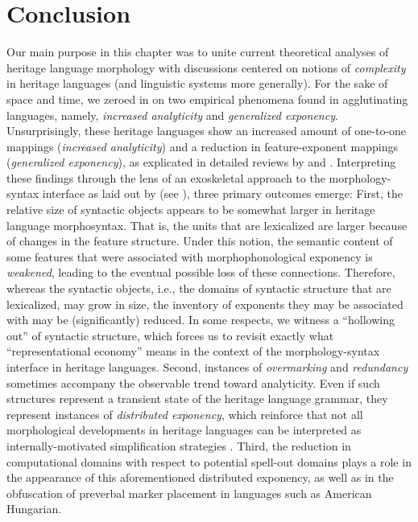 \documentclass[output=paper,colorlinks,citecolor=brown,footheight=42pt]{langscibook}
\begin{document}
\section{Conclusion} \label{outro}\largerpage[2]
Our main purpose in this chapter was to unite current theoretical analyses of heritage language morphology with discussions centered on notions of \textit{complexity} in heritage languages (and linguistic systems more generally). For the sake of space and time, we zeroed in on two empirical phenomena found in agglutinating languages, namely, \textit{increased analyticity} and \textit{generalized exponency}. Unsurprisingly, these heritage languages show an increased amount of one-to-one mappings (\textit{increased analyticity}) and a reduction in feature-exponent mappings (\textit{generalized exponency}), as explicated in detailed reviews by \citet[Ch.5]{polinsky2018heritage} and \citet{putnametal2021}. Interpreting these findings through the lens of an exoskeletal approach to the morphology-syntax interface as laid out by \citet{lohnput21} (see ), three primary outcomes emerge: First, the relative size of syntactic objects appears to be somewhat larger in heritage language morphosyntax. That is, the units that are lexicalized are larger because of changes in the feature structure. Under this notion, the semantic content of some features that were associated with morphophonological exponency is \textit{weakened}, leading to the eventual possible loss of these connections. Therefore, whereas the syntactic objects, i.e., the domains of syntactic structure that are lexicalized, may grow in size, the inventory of exponents they may be associated with may be (significantly) reduced. In some respects, we witness a “hollowing out” of syntactic structure, which forces us to revisit exactly what “representational economy” \citep{scontras2015,ScontrasEtAl2018,PolinskyScontras2020} means in the context of the morphology-syntax interface in heritage languages. Second, instances of \textit{overmarking} and \textit{redundancy} sometimes accompany the observable trend toward analyticity. Even if such structures represent a transient state of the heritage language grammar, they represent instances of \textit{distributed exponency}, which reinforce that not all morphological developments in heritage languages can be interpreted as internally-motivated simplification strategies \citep{bousquette2020}. Third, the reduction in computational domains with respect to potential spell-out domains plays a role in the appearance of this aforementioned distributed exponency, as well as in the obfuscation of preverbal marker placement in languages such as American Hungarian. 
\end{document}
